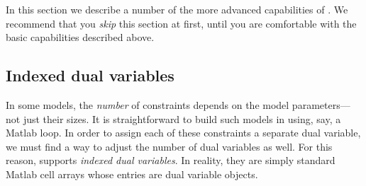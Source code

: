 \documentclass[12pt]{article}
\begin{document}
In this section we describe a number of the more advanced capabilities of \cvx.
We recommend that you \emph{skip} this section at first, until you are comfortable
with the basic capabilities described above.

\subsection{Indexed dual variables}
\label{sec:indexeddual}

In some models, the \emph{number} of constraints depends on the model
parameters---not just their sizes. It is
straightforward to build such models in \cvx using, say, a
Matlab \verb@for@ loop. In order to assign each of these constraints
a separate dual variable, we must find a way to adjust the number of
dual variables as well. For this reason, \cvx supports
\emph{indexed dual variables}. In reality, they are simply standard
Matlab cell arrays whose entries are \cvx dual variable objects.
\end{document}
